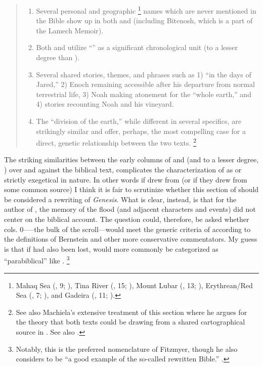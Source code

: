 \begin{quote}
\begin{enumerate}
    \item Several personal and geographic%
            \footnote{Mahaq Sea (, 9; ), Tina River (, 15; ), Mount Lubar (, 13; ), Erythrean/Red Sea (, 7; ), and Gadeira (, 11; ).}
        names which are never mentioned in the Bible show up in both \ga and \jub (including Bitenosh, which is a part of the Lamech Memoir).
    \item Both \jub and \ga utilize ``\jub'' as a significant chronological unit (\ga to a lesser degree than \jub).
    \item Several shared stories, themes, and phrases such as 1) ``in the days of Jared,'' 2) Enoch remaining accessible after his departure from normal terrestrial life, 3) Noah making atonement for the ``whole earth,'' and 4) stories recounting Noah and his vineyard.
    \item The ``division of the earth,'' while different in several specifics, are strikingly similar and offer, perhaps, the most compelling case for a direct, genetic relationship between the two texts.%
        \footnote{See also Machiela's extensive treatment of this section where he argues for the theory that both texts could be drawing from a shared cartographical source in \cite*[105--130]{machiela2009}. See also \cite{alexander_jjs1982}.}
\end{enumerate}
\end{quote}

The striking similarities between the early columns of \ga and \jub (and to a lesser degree, \firstenoch) over and against the biblical text, complicates the characterization of \ga as \rwb or strictly exegetical in nature. In other words if \ga drew from \jub (or if they drew from some common source) I think it is fair to scrutinize whether this section of \ga should be considered a rewriting of \emph{Genesis}. What is clear, instead, is that for the author of \ga, the memory of the flood (and adjacent characters and events) did not center on the biblical account. The question could, therefore, be asked whether cols. 0-----the bulk of the scroll---would meet the generic criteria of \rwb according to the definitions of Bernstein and other more conservative commentators. My guess is that if  had also been lost, \ga would more commonly be categorized as ``parabiblical'' like \firstenoch.%
    \footnote{Notably, this is the preferred nomenclature of Fitzmyer, though he also considers \ga to be ``a good example of the so-called rewritten Bible.'' \cite[20]{fitzmyer2004}.}

